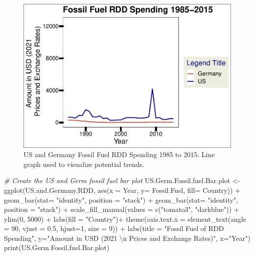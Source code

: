 \documentclass[
  12pt,
]{article}
\newenvironment{Shaded}{\begin{snugshade}}{\end{snugshade}}
\newcommand{\AttributeTok}[1]{\textcolor[rgb]{0.77,0.63,0.00}{#1}}
\newcommand{\CommentTok}[1]{\textcolor[rgb]{0.56,0.35,0.01}{\textit{#1}}}
\newcommand{\DecValTok}[1]{\textcolor[rgb]{0.00,0.00,0.81}{#1}}
\newcommand{\FloatTok}[1]{\textcolor[rgb]{0.00,0.00,0.81}{#1}}
\newcommand{\FunctionTok}[1]{\textcolor[rgb]{0.00,0.00,0.00}{#1}}
\newcommand{\NormalTok}[1]{#1}
\newcommand{\OtherTok}[1]{\textcolor[rgb]{0.56,0.35,0.01}{#1}}
\newcommand{\SpecialCharTok}[1]{\textcolor[rgb]{0.00,0.00,0.00}{#1}}
\newcommand{\StringTok}[1]{\textcolor[rgb]{0.31,0.60,0.02}{#1}}
\begin{document}
\begin{figure}
\centering
\includegraphics{Chang_Jenkins_Mullens_ENV872_Final_files/figure-latex/Fossil Fuel Germ and US Line-1.pdf}
\caption{US and Germany Fossil Fuel RDD Spending 1985 to 2015. Line
graph used to visualize potential trends.}
\end{figure}

\begin{Shaded}
\begin{Highlighting}[]
\CommentTok{\# Create the US and Germ fossil fuel bar plot}
\NormalTok{US.Germ.Fossil.fuel.Bar.plot }\OtherTok{\textless{}{-}} \FunctionTok{ggplot}\NormalTok{(US.and.Germany.RDD, }\FunctionTok{aes}\NormalTok{(}\AttributeTok{x =}\NormalTok{ Year, }\AttributeTok{y=}\NormalTok{ Fossil.Fuel, }\AttributeTok{fill=}\NormalTok{ Country)) }\SpecialCharTok{+}
  \FunctionTok{geom\_bar}\NormalTok{(}\AttributeTok{stat=} \StringTok{"identity"}\NormalTok{, }\AttributeTok{position =} \StringTok{"stack"}\NormalTok{) }\SpecialCharTok{+}
  \FunctionTok{geom\_bar}\NormalTok{(}\AttributeTok{stat=} \StringTok{"identity"}\NormalTok{, }\AttributeTok{position =} \StringTok{"stack"}\NormalTok{) }\SpecialCharTok{+}
  \FunctionTok{scale\_fill\_manual}\NormalTok{(}\AttributeTok{values =} \FunctionTok{c}\NormalTok{(}\StringTok{"tomato3"}\NormalTok{, }\StringTok{"darkblue"}\NormalTok{)) }\SpecialCharTok{+}
  \FunctionTok{ylim}\NormalTok{(}\DecValTok{0}\NormalTok{, }\DecValTok{5000}\NormalTok{) }\SpecialCharTok{+}
  \FunctionTok{labs}\NormalTok{(}\AttributeTok{fill =} \StringTok{"Country"}\NormalTok{)}\SpecialCharTok{+}
  \FunctionTok{theme}\NormalTok{(}\AttributeTok{axis.text.x =} \FunctionTok{element\_text}\NormalTok{(}\AttributeTok{angle =} \DecValTok{90}\NormalTok{, }\AttributeTok{vjust =} \FloatTok{0.5}\NormalTok{, }\AttributeTok{hjust=}\DecValTok{1}\NormalTok{, }\AttributeTok{size =} \DecValTok{9}\NormalTok{)) }\SpecialCharTok{+}
  \FunctionTok{labs}\NormalTok{(}\AttributeTok{title =} \StringTok{"Fossil Fuel of RDD Spending"}\NormalTok{,}
       \AttributeTok{y=}\StringTok{"Amount in USD (2021 }\SpecialCharTok{\textbackslash{}n}\StringTok{ Prices and Exchange Rates)"}\NormalTok{,}
       \AttributeTok{x=}\StringTok{"Year"}\NormalTok{)}
\FunctionTok{print}\NormalTok{(US.Germ.Fossil.fuel.Bar.plot)}
\end{Highlighting}
\end{Shaded}
\end{document}
